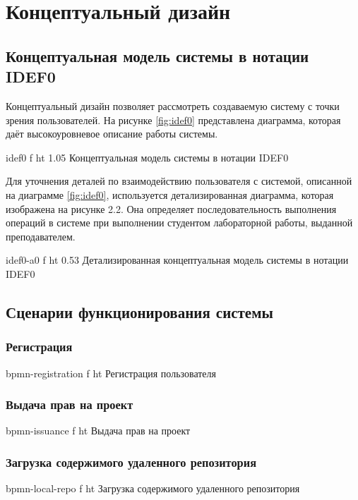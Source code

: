 \documentclass{bmstu}
\begin{document}
  \chapter{Концептуальный дизайн}
  
  \section{Концептуальная модель системы в нотации IDEF0}
  
  Концептуальный дизайн позволяет рассмотреть создаваемую систему с
  точки зрения пользователей. На рисунке \ref{fig:idef0} представлена диаграмма,
  которая даёт высокоуровневое описание работы системы.
  
  {idef0}
  {f}
  {ht}
  {1.05\textwidth}
  {Концептуальная модель системы в нотации IDEF0}
  \label{fig:idef0}
  
  Для уточнения деталей по взаимодействию пользователя с системой, описанной 
  на диаграмме \ref{fig:idef0}, используется детализированная диаграмма, которая изображена
  на рисунке 2.2. Она определяет последовательность выполнения операций в системе
  при выполнении студентом лабораторной работы, выданной преподавателем.
  
  {idef0-a0}
  {f}
  {ht}
  {0.53\textwidth}
  {Детализированная концептуальная модель системы в нотации IDEF0}
  \label{fig:idef0-a0}
  
  \FloatBarrier
  
\section{Сценарии функционирования системы}

\subsection*{Регистрация}
{bpmn-registration}
{f}
{ht}
{\textwidth}
{Регистрация пользователя}
\FloatBarrier

\subsection*{Выдача прав на проект}
{bpmn-issuance}
{f}
{ht}
{\textwidth}
{Выдача прав на проект}
\FloatBarrier

\subsection*{Загрузка содержимого удаленного репозитория}
{bpmn-local-repo}
{f}
{ht}
{\textwidth}
{Загрузка содержимого удаленного репозитория}
\FloatBarrier
\end{document}

